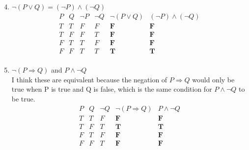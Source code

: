 \documentclass{article}
\begin{document}
\subsection{}
\begin{enumerate}
    \setcounter{enumi}{3}
    \item $\neg (P \lor Q) = (\neg P) \land (\neg Q) $
    \[
    \begin{array}{c|c|c|c|c|c}
        P & Q & \neg P & \neg Q & \neg (P \lor Q) & (\neg P) \land (\neg Q) \\ \hline
        T & T &   F    &   F    &   \mathbf{F}    &       \mathbf{F}        \\ \hline
        T & F &   F    &   T    &   \mathbf{F}    &       \mathbf{F}        \\ \hline
        F & T &   T    &   F    &   \mathbf{F}    &       \mathbf{F}        \\ \hline
        F & F &   T    &   T    &   \mathbf{T}    &       \mathbf{T}        \\
    
    \end{array}
    \]

    \setcounter{enumi}{11}
    \item $\neg (P \Rightarrow Q)$ and $P \land \neg Q$ \\
    I think these are equivalent because the negation of $P \Rightarrow Q$
    would only be true when P is true and Q is false, which is the same
    condition for $P \land \neg Q$ to be true.
    \[
    \begin{array}{c|c|c|c|c|c}
        P & Q & \neg Q & \neg (P \Rightarrow Q) & P \land \neg Q \\ \hline
        T & T &   F    &       \mathbf{F}       &   \mathbf{F}   \\ \hline
        T & F &   T    &       \mathbf{T}       &   \mathbf{T}   \\ \hline
        F & T &   F    &       \mathbf{F}       &   \mathbf{F}   \\ \hline
        F & F &   T    &       \mathbf{F}       &   \mathbf{F}   \\
    
    \end{array}
    \]
\end{enumerate}

\end{document}
